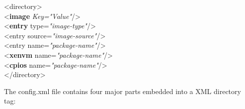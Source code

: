 \begin{itemize}
      \begin{Command}{9cm}
      <directory>\\
      \hspace*{1cm}<\textbf{image} \textit{Key="Value"}/>\\
      \hspace*{1cm}<\textbf{entry} type=\textit{"image-type"}/>\\
      \hspace*{1cm}<entry source=\textit{"image-source"}/>\\
      \hspace*{1cm}<entry name=\textit{"package-name"}/>\\
      \hspace*{1cm}<\textbf{xenvm} name=\textit{"package-name"}/>\\
      \hspace*{1cm}<\textbf{cpios} name=\textit{"package-name"}/>\\
      </directory>
	  \end{Command}

      The config.xml file contains four major parts embedded into a
      XML directory tag:


\end{itemize}
